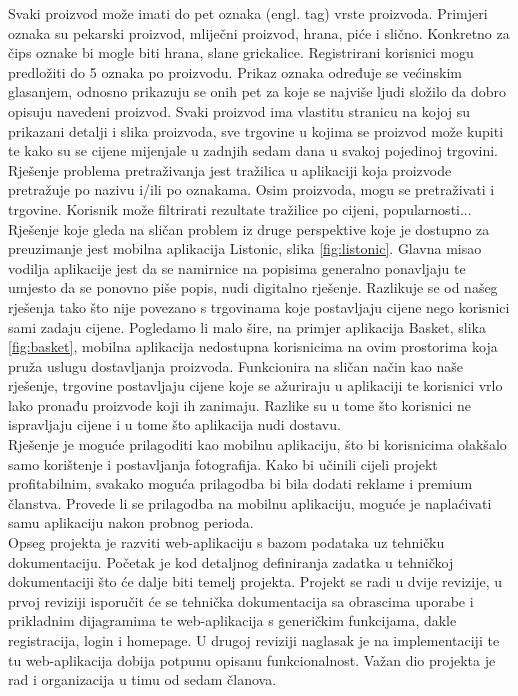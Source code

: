 		Svaki proizvod može imati do pet oznaka (engl. tag) vrste proizvoda. Primjeri oznaka su pekarski proizvod, mliječni proizvod, hrana, piće i slično. Konkretno za čips oznake bi mogle biti hrana, slane grickalice. Registrirani korisnici mogu predložiti do 5 oznaka po proizvodu. Prikaz oznaka određuje se većinskim glasanjem, odnosno prikazuju se onih pet za koje se najviše ljudi složilo da dobro opisuju navedeni proizvod. Svaki proizvod ima vlastitu stranicu na kojoj su prikazani detalji i slika proizvoda, sve trgovine u kojima se proizvod može kupiti te kako su se cijene mijenjale u zadnjih sedam dana u svakoj pojedinoj trgovini.\\
		
		Rješenje problema pretraživanja jest tražilica u aplikaciji koja proizvode pretražuje po nazivu i/ili po oznakama. Osim proizvoda, mogu se pretraživati i trgovine. Korisnik može filtrirati rezultate tražilice po cijeni, popularnosti...\\
		
		Rješenje koje gleda na sličan problem iz druge perspektive koje je dostupno za preuzimanje jest mobilna aplikacija Listonic, slika \ref{fig:listonic}. Glavna misao vodilja aplikacije jest da se namirnice na popisima generalno ponavljaju te umjesto da se ponovno piše popis, nudi digitalno rješenje. Razlikuje se od našeg rješenja tako što nije povezano s trgovinama koje postavljaju cijene nego korisnici sami zadaju cijene. Pogledamo li malo šire, na primjer aplikacija Basket, slika \ref{fig:basket}, mobilna aplikacija nedostupna korisnicima na ovim prostorima koja pruža uslugu dostavljanja proizvoda. Funkcionira na sličan način kao naše rješenje, trgovine postavljaju cijene koje se ažuriraju u aplikaciji te korisnici vrlo lako pronađu proizvode koji ih zanimaju. Razlike su u tome što korisnici ne ispravljaju cijene i u tome što aplikacija nudi dostavu.\\
		
		Rješenje je moguće prilagoditi kao mobilnu aplikaciju, što bi korisnicima olakšalo samo korištenje i postavljanja fotografija. Kako bi učinili cijeli projekt profitabilnim, svakako moguća prilagodba bi bila dodati reklame i premium članstva. Provede li se prilagodba na mobilnu aplikaciju, moguće je naplaćivati samu aplikaciju nakon probnog perioda.\\
		
		Opseg projekta je razviti web-aplikaciju s bazom podataka uz tehničku dokumentaciju. Početak je kod detaljnog definiranja zadatka u tehničkoj dokumentaciji što će dalje biti temelj projekta. Projekt se radi u dvije revizije, u prvoj reviziji isporučit će se tehnička dokumentacija sa obrascima uporabe i prikladnim dijagramima te web-aplikacija s generičkim funkcijama, dakle registracija, login i homepage. U drugoj reviziji naglasak je na implementaciji te tu web-aplikacija dobija potpunu opisanu funkcionalnost. Važan dio projekta je rad i organizacija u timu od sedam članova.\\
		
